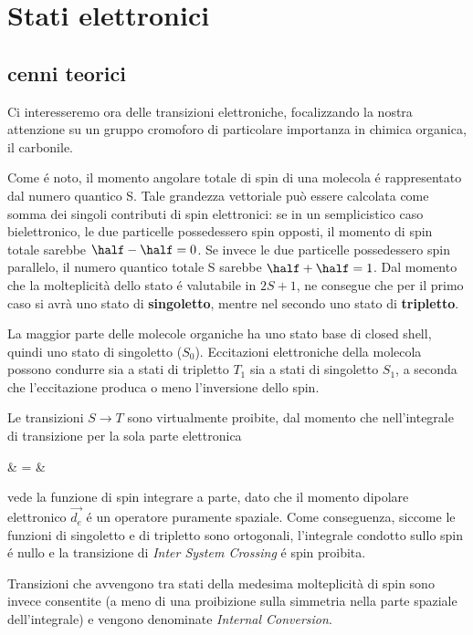 \section{Stati elettronici}
\subsection{cenni teorici}

Ci interesseremo ora delle transizioni elettroniche, focalizzando la nostra attenzione
su un gruppo cromoforo di particolare importanza in chimica organica, il carbonile.

Come \'e noto, il momento angolare totale di spin di una molecola \'e
rappresentato dal numero quantico S. Tale grandezza vettoriale pu\`o essere 
calcolata come somma dei singoli contributi di spin elettronici: se in un 
semplicistico caso bielettronico, le due particelle possedessero spin opposti,
il momento di spin totale sarebbe $ \half - \half = 0 $. Se invece le due 
particelle possedessero spin parallelo, il numero quantico totale S sarebbe 
$ \half + \half = 1 $. Dal momento che la molteplicit\`a dello stato \'e 
valutabile in $ 2 S + 1 $, ne consegue che per il primo caso si avr\`a uno
stato di \textbf{singoletto}, mentre nel secondo uno stato di \textbf{tripletto}.

La maggior parte delle molecole organiche ha uno stato base di
closed shell, quindi uno stato di singoletto ($S_{0}$). Eccitazioni elettroniche
della molecola possono condurre sia a stati di tripletto $T_{1}$ sia a stati di
singoletto $S_{1}$, a seconda che l'eccitazione produca o meno l'inversione
dello spin.

Le transizioni $ S \rightarrow T $ sono virtualmente proibite, dal
momento che nell'integrale di transizione per la sola parte elettronica

\beqas
{} & = &
\eeqas

vede la funzione di spin integrare a parte, dato che il momento
dipolare elettronico $\overrightarrow{d_{e}}$ \'e un operatore 
puramente spaziale. 
Come conseguenza, siccome le funzioni di singoletto e di tripletto
sono ortogonali, l'integrale condotto sullo spin \'e nullo e la
transizione di \textit{Inter System Crossing} \'e spin proibita.

Transizioni che avvengono tra stati della medesima molteplicit\`a di spin
sono invece consentite (a meno di una proibizione sulla simmetria nella
parte spaziale dell'integrale) e vengono denominate \textit{Internal
Conversion}.

